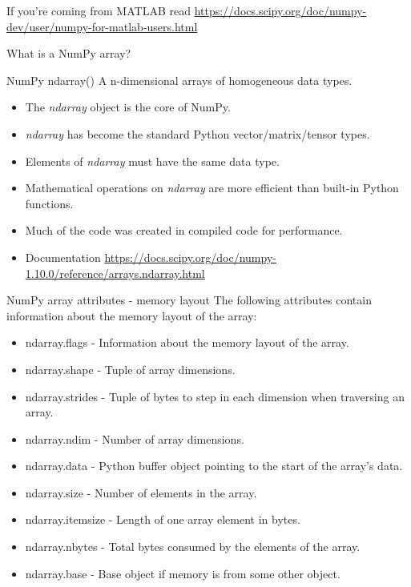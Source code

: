 \documentclass[10pt]{beamer}
\begin{document}
\begin{frame}{If you're coming from MATLAB read}
\url{https://docs.scipy.org/doc/numpy-dev/user/numpy-for-matlab-users.html}
\end{frame}



\begin{frame}[fragile]{What is a NumPy array?}
	\begin{alertblock}{NumPy ndarray()}
A n-dimensional arrays of homogeneous data types. 
	\end{alertblock}

\begin{itemize}
\item The \textit{ndarray} object is the core of NumPy.
\item \textit{ndarray} has become the standard Python vector/matrix/tensor types.
\item Elements of \textit{ndarray} must have the same data type.
\item Mathematical operations on \textit{ndarray} are more efficient than built-in Python functions.
\item Much of the code was created in compiled code for performance. 
\item Documentation \url{https://docs.scipy.org/doc/numpy-1.10.0/reference/arrays.ndarray.html}
\end{itemize}
\end{frame}

\begin{frame}[fragile]{NumPy array attributes - memory layout}
The following attributes contain information about the memory layout of the array:
\begin{itemize}
\item ndarray.flags - Information about the memory layout of the array.
\item ndarray.shape -	Tuple of array dimensions.
\item ndarray.strides -	Tuple of bytes to step in each dimension when traversing an array.
\item ndarray.ndim -	Number of array dimensions.
\item ndarray.data -	Python buffer object pointing to the start of the array’s data.
\item ndarray.size -	Number of elements in the array.
\item ndarray.itemsize - 	Length of one array element in bytes.
\item ndarray.nbytes - 	Total bytes consumed by the elements of the array.
\item ndarray.base -	Base object if memory is from some other object.
\end{itemize}
\end{frame}
\end{document}
